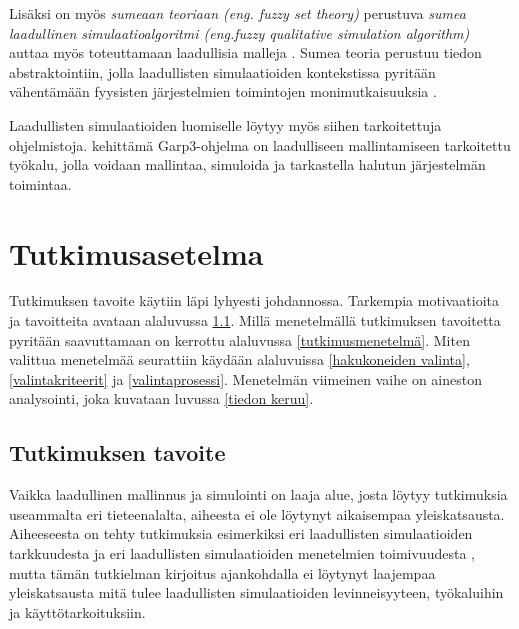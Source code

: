 \documentclass[utf8]{gradu3}
\begin{document}
Lisäksi on myös \textit{sumeaan teoriaan (eng. fuzzy set theory)} 
perustuva \textit{sumea laadullinen simulaatioalgoritmi 
(eng.fuzzy qualitative simulation algorithm)} 
auttaa myös toteuttamaan laadullisia malleja \parencite{shen1993fuzzy}.
Sumea teoria perustuu tiedon abstraktointiin, 
jolla laadullisten simulaatioiden kontekstissa pyritään vähentämään 
fyysisten järjestelmien toimintojen monimutkaisuuksia
\parencite{shen1993fuzzy}. 

Laadullisten simulaatioiden luomiselle löytyy myös siihen tarkoitettuja ohjelmistoja.
\textcite{bredeweg2007garp3} kehittämä Garp3-ohjelma on laadulliseen 
mallintamiseen tarkoitettu työkalu, jolla voidaan mallintaa, simuloida ja
tarkastella halutun järjestelmän toimintaa.

\chapter{Tutkimusasetelma}
\begin{comment}
Numeroidut osat ovat lukuja ja niiden alalukuja, jotka sitten jakutuvat numeroimattomiksi kappaleiksi. Englannin chapter ei ole kappale vaan kappale on paragraph.

Konkreettisena ohjeena, välltäisin 1 virkkeen kaltaista suoraan osoittavaa lausetta. Tyylillisesti voisi aloittaa vaikka tähän tapaan: Simulaatiot perustuvat aina malleihin. Mallien muodostamista kuttsutaan mallintamiseksi. Alaluvussa 2.1 avataan mallintamisen prosessia ja sen roolia osana simulointiin perustuvaa tutkimusta.....
\end{comment}
Tutkimuksen tavoite käytiin läpi lyhyesti johdannossa.
Tarkempia motivaatioita ja tavoitteita avataan alaluvussa
\ref{tavoite}.
Millä menetelmällä tutkimuksen tavoitetta pyritään saavuttamaan on kerrottu alaluvussa 
\ref{tutkimusmenetelmä}. 
Miten valittua menetelmää seurattiin käydään alaluvuissa 
\ref{hakukoneiden valinta}, \ref{valintakriteerit} ja \ref{valintaprosessi}.
Menetelmän viimeinen vaihe on aineston analysointi, joka kuvataan luvussa
\ref{tiedon keruu}.

 \section{Tutkimuksen tavoite} \label{tavoite}
Vaikka laadullinen mallinnus ja simulointi on laaja alue, 
josta löytyy tutkimuksia useammalta eri tieteenalalta, 
aiheesta ei ole löytynyt aikaisempaa yleiskatsausta. Aiheeseesta on tehty tutkimuksia esimerkiksi eri laadullisten simulaatioiden tarkkuudesta \parencite{FisherManagmentTechniques2024} ja eri laadullisten simulaatioiden menetelmien toimivuudesta \parencite{qualitativeSimTechniquesAssesment1992}, mutta tämän tutkielman kirjoitus ajankohdalla ei löytynyt laajempaa yleiskatsausta mitä tulee laadullisten simulaatioiden levinneisyyteen, työkaluihin ja käyttötarkoituksiin.  
\end{document}

